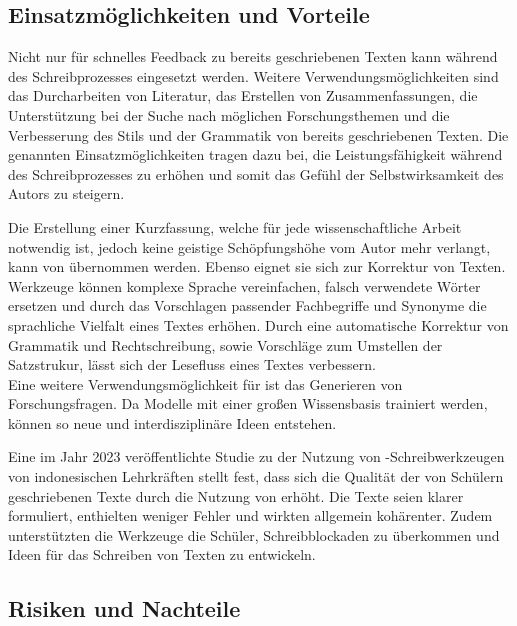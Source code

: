 \documentclass[../main.tex]{subfiles}
\begin{document}
\subsection{Einsatzmöglichkeiten und Vorteile}

Nicht nur für schnelles Feedback zu bereits geschriebenen Texten kann  während des Schreibprozesses eingesetzt werden. 
Weitere Verwendungsmöglichkeiten sind das Durcharbeiten von Literatur, das Erstellen von Zusammenfassungen, die Unterstützung bei der Suche nach 
möglichen Forschungsthemen und die Verbesserung des Stils und der Grammatik von bereits geschriebenen Texten. Die genannten Einsatzmöglichkeiten 
tragen dazu bei, die Leistungsfähigkeit während des Schreibprozesses zu erhöhen und somit das Gefühl der Selbstwirksamkeit des Autors zu steigern.\cite{SelfEfficacyBeliefs}

Die Erstellung einer Kurzfassung, welche für jede wissenschaftliche Arbeit notwendig ist, jedoch keine geistige Schöpfungshöhe vom Autor mehr verlangt, 
kann von  übernommen werden. Ebenso eignet sie sich zur Korrektur von Texten.  Werkzeuge können komplexe Sprache vereinfachen, falsch 
verwendete Wörter ersetzen und durch das Vorschlagen passender Fachbegriffe und Synonyme die sprachliche Vielfalt eines Textes erhöhen. Durch eine 
automatische Korrektur von Grammatik und Rechtschreibung, sowie Vorschläge zum Umstellen der Satzstrukur, lässt sich der Lesefluss eines Textes verbessern.\cite{ZukunftWissenschaftlichesPublizieren,teachers}\\
Eine weitere Verwendungsmöglichkeit für  ist das Generieren von Forschungsfragen. Da  Modelle mit einer großen Wissensbasis trainiert werden, 
können so neue und interdisziplinäre Ideen entstehen.\cite{ZukunftWissenschaftlichesPublizieren,humanWritingToAi}

Eine im Jahr 2023 veröffentlichte Studie zu der Nutzung von -Schreibwerkzeugen von indonesischen Lehrkräften stellt fest, dass sich die Qualität der von 
Schülern geschriebenen Texte durch die Nutzung von  erhöht. Die Texte seien klarer formuliert, enthielten weniger Fehler und 
wirkten allgemein kohärenter. Zudem unterstützten die  Werkzeuge die Schüler, Schreibblockaden zu überkommen und Ideen für das Schreiben von Texten zu entwickeln.\cite{teachers} 

\subsection{Risiken und Nachteile}
\end{document}
